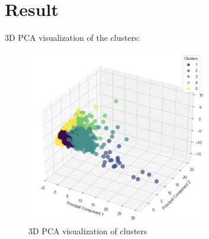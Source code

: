 \section{Result}
3D PCA visualization of the clusters:

\begin{figure}[H]
    \centering
    \includegraphics[width=0.7\textwidth]{src/figs/3d_PCA_HC.png} 
    \caption{3D PCA visualization of clusters}
\end{figure}